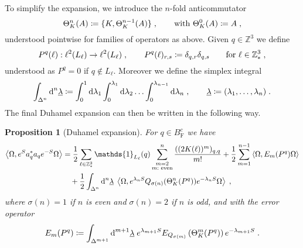 \documentclass[12pt,a4paper]{article}
\numberwithin{equation}{section}
\newcommand{\Zbb}{\mathbb{Z}}
\newcommand{\ulambda}{\underline{\lambda}}
\newcommand{\1}{\mathbb{I}}
\newcommand{\di}{\textnormal{d}}
\newcommand{\F}{\mathrm{F}}
\newcommand{\Z}{\mathbb{Z}}
\newcommand{\half}{\frac{1}{2}}
\newcommand{\eva}[1]{\left\langle #1 \right\rangle}
\theoremstyle{plain}
\newtheorem{proposition}[theorem]{Proposition}
\theoremstyle{definition}
\theoremstyle{remark}
\theoremstyle{plain}
\theoremstyle{definition}
\theoremstyle{remark}
\begin{document}
To simplify the expansion, we introduce the $n$-fold anticommutator
\begin{equation} \label{eq:Theta}
	\Theta_K^n (A)
	\coloneq \{ K, \Theta_K^{n-1} (A) \} \;, \qquad
	\textnormal{with }
	\Theta_K^0 (A)
	\coloneq A \;,
\end{equation}
understood pointwise for families of operators as above.
Given $q \in \Zbb^3$ we define
\begin{equation} \label{eq:Pq}
	P^q(\ell) : \ell^2(L_\ell) \to \ell^2(L_\ell) \;, \qquad
	P^q(\ell)_{r,s} \coloneq \delta_{q,r} \delta_{q,s} \qquad
	\textnormal{for } \ell \in \Z^3_* \;,
\end{equation}
understood as $ P^q = 0 $ if $ q \notin L_\ell $.
Moreover we define the simplex integral
\begin{equation} \label{eq:Deltan}
	\int_{\Delta^n} \di^n \ulambda
	\coloneq \int_0^1 \di \lambda_1 \int_0^{\lambda_1} \di \lambda_2 \ldots \int_0^{\lambda_{n-1}} \di \lambda_n \;, \qquad
	\ulambda \coloneq (\lambda_1, \ldots, \lambda_n) \;.
\end{equation}
 The final Duhamel expansion can then be written in the following way.

\begin{proposition}[Duhamel expansion]\label{prop:finexpan}
For $q \in B^c_{\F}$ we have
\begin{align} \label{eq:finexpan}
	\eva{\Omega, e^{S} a_q^* a_q e^{-S} \Omega} 
	&= \half\sum_{\ell\in \Z^3_*}\mathds{1}_{L_\ell}(q) \sum_{\substack{m=2\\m:\textnormal{ even}}}^n \frac{((2K(\ell))^m)_{q,q}}{m!}
		+ \half \sum_{m=1}^{n-1} \eva{\Omega, E_m(P^q)\Omega}\nonumber\\
	&\quad +\half \int_{\Delta^n} \di^n\underline{\lambda} \;
		\eva{\Omega, e^{\lambda_n S}Q_{\sigma(n)}(\Theta^n_{K}(P^q)) e^{-\lambda_n S} \Omega} \;,
\end{align}
where $ \sigma(n) = 1 $ if $n$ is even and $ \sigma(n) = 2 $ if $n$ is odd, and with the error operator
\begin{equation}\label{eq:errEm}
	E_m(P^q) \coloneq \int_{\Delta^{m+1}} \di^{m+1} \underline{\lambda} \;
		e^{\lambda_{m+1} S} E_{Q_{\sigma(m)}}\left(\Theta^{m}_{K}(P^q)\right) e^{-\lambda_{m+1} S} \;.
\end{equation}
\end{proposition}
\end{document}
